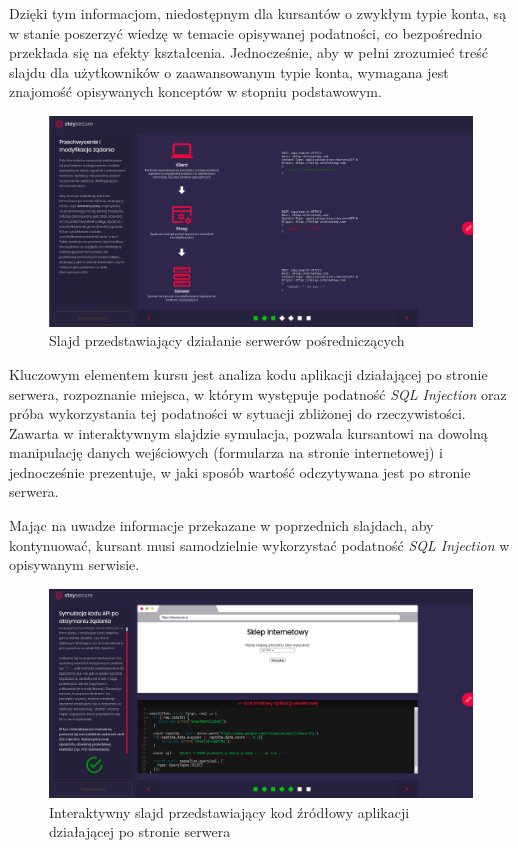 \documentclass[12pt,twoside]{article}
\begin{document}
Dzięki tym informacjom, niedostępnym dla kursantów o zwykłym typie konta, są w stanie poszerzyć wiedzę w temacie opisywanej podatności, co bezpośrednio przekłada się na efekty kształcenia. Jednocześnie, aby w pełni zrozumieć treść slajdu dla użytkowników o zaawansowanym typie konta, wymagana jest znajomość opisywanych konceptów w stopniu podstawowym.

\begin{figure}[H]
	\centering
	\includegraphics[width=1\linewidth]{figures/sql-slide-screenshot3.png}
	\caption{Slajd przedstawiający działanie serwerów pośredniczących}
	\label{Fig:Interaktywny slajd przedstawiający budowę omawianej strony}
\end{figure} 

Kluczowym elementem kursu jest analiza kodu aplikacji działającej po stronie serwera, rozpoznanie miejsca, w którym występuje podatność \emph{SQL Injection} oraz próba wykorzystania tej podatności w sytuacji zbliżonej do rzeczywistości. Zawarta w interaktywnym slajdzie symulacja, pozwala kursantowi na dowolną manipulację danych wejściowych (formularza na stronie internetowej) i jednocześnie prezentuje, w jaki sposób wartość odczytywana jest po stronie serwera. 

Mając na uwadze informacje przekazane w poprzednich slajdach, aby kontynuować, kursant musi samodzielnie wykorzystać podatność \emph{SQL Injection} w opisywanym serwisie.
 
 \begin{figure}[H]
 	\centering
 	\includegraphics[width=1\linewidth]{figures/sql-slide-screenshot2.png}
 	\caption{Interaktywny slajd przedstawiający kod źródłowy aplikacji działającej po stronie serwera}
 	\label{Fig:Interaktywny slajd przedstawiający budowę omawianej strony}
 \end{figure} 
 
\end{document}
